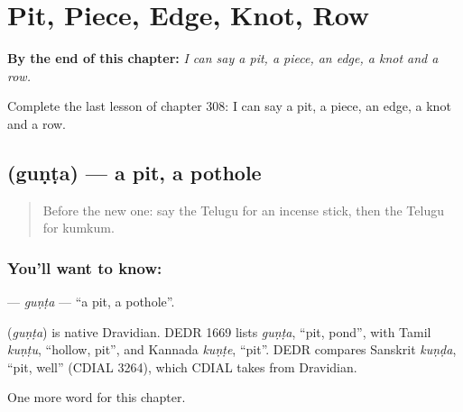 
\chapter{Pit, Piece, Edge, Knot, Row}
\label{ch:te-pit-piece-edge-knot-row}

\begin{chapteropening}
\textbf{By the end of this chapter:} \emph{I can say a pit, a piece, an edge, a knot and a row.}

Complete the last lesson of chapter 308: I can say a pit, a piece, an edge, a knot and a row.
\end{chapteropening}

\section[\texorpdfstring{\te{గుంట} (guṇṭa)}{గుంట (guṇṭa)}]{ (guṇṭa) — a pit, a pothole}

\label{lesson:TE-C308-gunta}



\begin{quote}
Before the new one: say the Telugu for an incense stick, then the Telugu for kumkum.
\end{quote}

\subsection*{You'll want to know: }
\textbf{} — \emph{guṇṭa} — \textquotedblleft{}a pit, a pothole\textquotedblright{}.

\begin{cousinweb}
\textbf{} (\emph{guṇṭa}) is native Dravidian. DEDR 1669 lists \emph{guṇṭa}, \textquotedblleft{}pit, pond\textquotedblright{}, with Tamil \emph{kuṇṭu}, \textquotedblleft{}hollow, pit\textquotedblright{}, and Kannada \emph{kuṇṭe}, \textquotedblleft{}pit\textquotedblright{}. DEDR compares Sanskrit \emph{kuṇḍa}, \textquotedblleft{}pit, well\textquotedblright{} (CDIAL 3264), which CDIAL takes from Dravidian.
\end{cousinweb}

\begin{grammarlens}[title={What you've built}]
One more word for this chapter.
\end{grammarlens}

